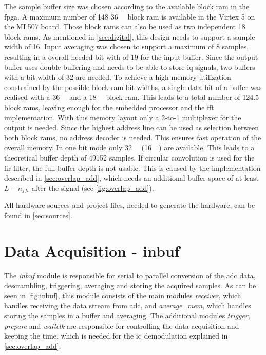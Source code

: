 \documentclass[12pt,a4paper,parskip=full,abstract=true,BCOR=12mm,twoside,open=right]{scrreprt}
\def\device#1{\textit{#1}}
\begin{document}
The sample buffer size was chosen according to the available block
\gls{ram} in the \gls{fpga}. A maximum number of 148 \SI{36}{\kilo\bit} block
\gls{ram} is available in the Virtex 5 on the ML507 board. Those block \glspl{ram}
can also be used as two independent \SI{18}{\kilo\bit} block \glspl{ram}. As
mentioned in \cref{sec:digital}, this design needs to support a sample width
of \SI{16}{\bit}. Input averaging was chosen to support a maximum of 8 samples,
resulting in a overall needed bit with of \SI{19}{\bit} for the input buffer. Since
the output buffer uses double buffering and needs to be able to store \gls{iq} signals,
two buffers with a bit width of \SI{32}{\bit} are needed. To achieve a high memory utilization
constrained by the possible block \gls{ram} bit widths, a single data bit of a buffer was
realised with a \SI{36}{\kilo\bit} and a \SI{18}{\kilo\bit} block \gls{ram}. This leads
to a total number of 124.5 block \glspl{ram}, leaving enough for the embedded processor
and the \gls{fft} implementation. With this memory layout only a 2-to-1 multiplexer
for the output is needed. Since the highest address line can
be used as selection between both block \glspl{ram}, no address decoder is needed. This ensures fast operation of the
overall memory. In one bit mode only \SI{32}{\kilo\bit} (\SI{16}{\kilo\bit})
are available. This leads to a theoretical buffer depth of 49152 samples. If circular
convolution is used for the \gls{fir} filter, the full buffer depth is not usable. This
is caused by the implementation described in \cref{sec:overlap_add}, which needs an
additional buffer space of at least $L - n_{fft}$ after the signal (see \cref{fig:overlap_add}).

All hardware sources and project files, needed to generate the hardware, can
be found in \cref{sec:sources}.


\section[Data Acquisition]{Data Acquisition - inbuf}
\label{sec:acquisition}

The \device{inbuf} module is responsible for serial to parallel conversion
of the \gls{adc} data, descrambling, triggering, averaging and storing
the acquired samples. As can be seen in \cref{fig:inbuf}, this module consists
of the main modules \device{receiver}, which handles receiving the data stream from
\gls{adc}, and \device{average\_mem}, which handles storing the samples in a buffer
and averaging. The additional modules \device{trigger}, \device{prepare} and
\device{wallclk} are responsible for controlling the data acquisition and keeping
the time, which is needed for the \gls{iq} demodulation explained in \cref{sec:overlap_add}.
\end{document}
